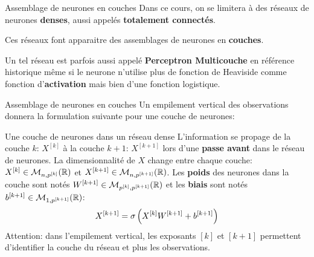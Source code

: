 \begin{frame}{Assemblage de neurones en couches}
	Dans ce cours, on se limitera à des réseaux de neurones \textbf{denses}, aussi appelés \textbf{totalement connectés}. 
	
	\vspace{0.3cm}
	
	Ces réseaux font apparaitre des assemblages de neurones en \textbf{couches}. 
	
	\vspace{0.3cm}
	
	Un tel réseau est parfois aussi appelé \textbf{Perceptron Multicouche} en référence historique même si le neurone n'utilise plus de fonction de Heaviside comme fonction d'\textbf{activation} mais bien d'une fonction logistique.
\end{frame}

\begin{frame}{Assemblage de neurones en couches}
	Un empilement vertical des observations donnera la formulation suivante pour une couche de neurones:
	
	\begin{block}{Une couche de neurones dans un réseau dense}
		L'information se propage de la couche $k$: $X^{[k]}$ à la couche $k+1$: $X^{[k+1]}$ lors d'une \textbf{passe avant} dans le réseau de neurones. La dimensionnalité de $X$ change entre chaque couche: $X^{[k]} \in \mathcal{M}_{n,p^{[k]}}(\mathbb{R})$ et $X^{[k+1]} \in \mathcal{M}_{n,p^{[k+1]}}(\mathbb{R})$. Les \textbf{poids} des neurones dans la couche sont notés $W^{[k+1]} \in \mathcal{M}_{p^{[k]},p^{[k+1]}}(\mathbb{R})$ et les \textbf{biais} sont notés $b^{[k+1]} \in \mathcal{M}_{1,p^{[k+1]}}(\mathbb{R})$:
		\begin{equation*}
			X^{[k+1]} = \operatorname{\sigma}\left(X^{[k]} W^{[k+1]} + b^{[k+1]}\right)
		\end{equation*}
		Attention: dans l'empilement vertical, les exposants $[k]$ et $[k+1]$ permettent d'identifier la couche du réseau et plus les observations.
	\end{block}
\end{frame}

